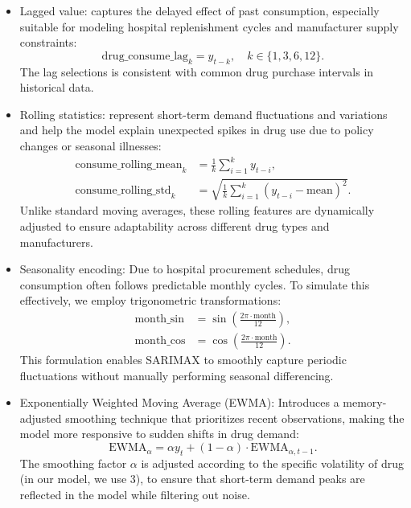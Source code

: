 \documentclass[journal]{IEEEtran}
\begin{document}
\begin{itemize}
    \item Lagged value: captures the delayed effect of past consumption, especially suitable for modeling hospital replenishment cycles and manufacturer supply constraints:
    \begin{equation}
    \text{drug\_consume\_lag}_{k} = y_{t-k}, \quad k \in \{1, 3, 6, 12\}.
    \end{equation}
    The lag selections is consistent with common drug purchase intervals in historical data.

    \item Rolling statistics: represent short-term demand fluctuations and variations and help the model explain unexpected spikes in drug use due to policy changes or seasonal illnesses:
    \begin{align}
    \text{consume\_rolling\_mean}_{k} &= \frac{1}{k} \sum_{i=1}^{k} y_{t-i}, \\
    \text{consume\_rolling\_std}_{k} &= \sqrt{\frac{1}{k} \sum_{i=1}^{k} (y_{t-i} - \text{mean})^2}.
    \end{align}
    Unlike standard moving averages, these rolling features are dynamically adjusted to ensure adaptability across different drug types and manufacturers.

    \item Seasonality encoding: Due to hospital procurement schedules, drug consumption often follows predictable monthly cycles. To simulate this effectively, we employ trigonometric transformations:
    \begin{align}
    \text{month\_sin} &= \sin\left(\frac{2\pi \cdot \text{month}}{12}\right), \\
    \text{month\_cos} &= \cos\left(\frac{2\pi \cdot \text{month}}{12}\right).
    \end{align}
    This formulation enables SARIMAX to smoothly capture periodic fluctuations without manually performing seasonal differencing.

    \item Exponentially Weighted Moving Average (EWMA): Introduces a memory-adjusted smoothing technique that prioritizes recent observations, making the model more responsive to sudden shifts in drug demand:
    \begin{equation}
    \text{EWMA}_{\alpha} = \alpha y_{t} + (1-\alpha) \cdot \text{EWMA}_{\alpha,t-1}.
    \end{equation}
    The smoothing factor \(\alpha\) is adjusted according to the specific volatility of drug (in our model, we use 3), to ensure that short-term demand peaks are reflected in the model while filtering out noise.


\end{itemize}
\end{document}
